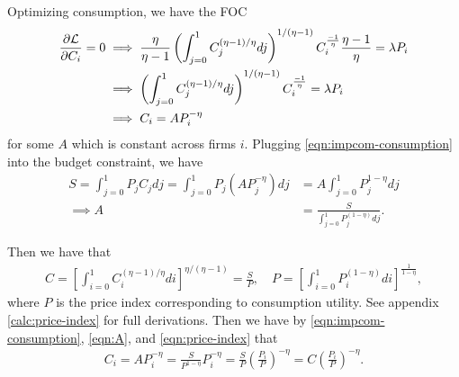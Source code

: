 \documentclass[../main.tex]{subfiles}
\begin{document}
        Optimizing consumption, we have the FOC
        \begin{align}
            \frac{\partial \mathcal{L}}{\partial C_i} = 0
            &\implies 
            \frac{\eta}{\eta - 1} \left(
                    \int_{j=0}^1 C_j^{(\eta - 1)/\eta} dj
                \right)^{1 / (\eta - 1)} C_i^{\frac{- 1}{\eta}} \frac{\eta - 1}{\eta}
            = \lambda P_i
            \\
            &\implies
            \left(
                    \int_{j=0}^1 C_j^{(\eta - 1)/\eta} dj
                \right)^{1 / (\eta - 1)} C_i^{\frac{- 1}{\eta}}
            = \lambda P_i
            \\
            &\implies
            C_i = A P_i^{-\eta}
            \label{eqn:impcom-consumption}
        \end{align}
        for some $A$ which is constant across firms $i$. Plugging \eqref{eqn:impcom-consumption} into the budget constraint,
        we have
        \begin{align}
            S
            = \int_{j=0}^1 P_j C_j dj
            = \int_{j=0}^1 P_j (A  P_j^{-\eta}) dj
            &= A \int_{j=0}^1 P_j^{1-\eta} dj
            \\ \implies
            A
            &= \frac{S}{\int_{j=0}^1 P_j^{(1-\eta)} dj}.
            \label{eqn:A}
        \end{align}
        
        Then we have that
        \begin{align}
            C
            = \left[
                    \int_{i=0}^1 C_i^{(\eta - 1)/\eta} di
                \right]^{\eta / (\eta - 1)}
            = \frac{S}{P},
            \quad
            P = \left[
                \int_{i=0}^1
                P_i^{(1-\eta)}
                di
                \right]^{\frac{1}{1 - \eta}},
            \label{eqn:price-index}
        \end{align}
        where $P$ is the price index corresponding to consumption utility. See appendix \eqref{calc:price-index} for full derivations. Then we have by \eqref{eqn:impcom-consumption}, \eqref{eqn:A}, and \eqref{eqn:price-index} that
        \begin{align}
            C_i = A P_i^{-\eta}
            = \frac{S}{P^{1-\eta}} P_i^{-\eta}
            = \frac{S}{P} \left(\frac{P_i}{P}\right)^{-\eta}
            = C \left(\frac{P_i}{P}\right)^{-\eta}.
            \label{eqn:consumption-demand}
        \end{align}
        
\end{document}
